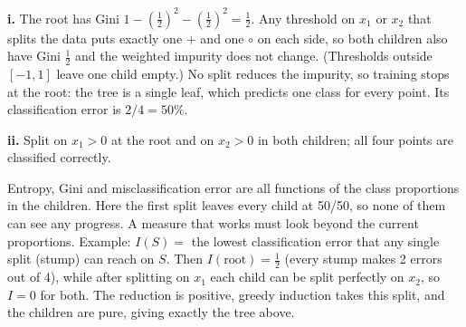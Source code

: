 \documentclass{article}
\begin{document}
\begin{solution}
\upshape
\textbf{i.} The root has Gini $1-(\tfrac12)^2-(\tfrac12)^2=\tfrac12$. Any threshold on $x_1$ or $x_2$ that splits the data
puts exactly one $+$ and one $\circ$ on each side, so both children also have Gini $\tfrac12$ and the weighted
impurity does not change. (Thresholds outside $[-1,1]$ leave one child empty.) No split reduces the impurity, so training stops at
the root: the tree is a single leaf, which predicts one class for every point. Its classification error is $2/4 = 50\%$.

\begin{center}
\end{center}

\textbf{ii.} Split on $x_1>0$ at the root and on $x_2>0$ in both children; all four points are classified correctly.

\begin{center}
\end{center}

Entropy, Gini and misclassification error are all functions of the class proportions in the children. Here the first split leaves
every child at 50/50, so none of them can see any progress. A measure that works must look beyond the current proportions.
Example: $I(S)=$ the lowest classification error that any single split (stump) can reach on $S$.
Then $I(\text{root})=\tfrac12$ (every stump makes 2 errors out of 4), while after splitting on $x_1$ each child can be split perfectly on $x_2$, so $I=0$ for both.
The reduction is positive, greedy induction takes this split, and the children are pure, giving exactly the tree above.


\end{solution}
\end{document}
